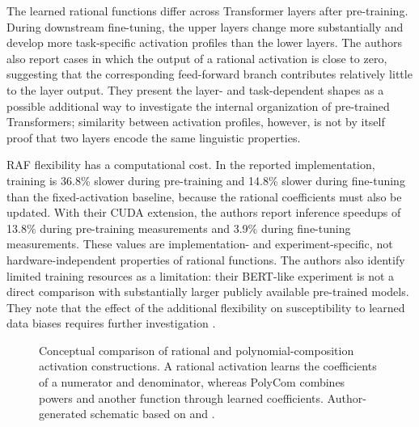 The learned rational functions differ across Transformer layers after
pre-training. During downstream fine-tuning, the upper layers change more
substantially and develop more task-specific activation profiles than
the lower layers. The authors also report cases in which the output of a
rational activation is close to zero, suggesting that the corresponding
feed-forward branch contributes relatively little to the layer output.
They present the layer- and task-dependent shapes as a possible
additional way to investigate the internal organization of
pre-trained Transformers; similarity between activation profiles,
however, is not by itself proof that two layers encode the same
linguistic properties.

RAF flexibility has a computational cost. In the reported implementation,
training is 36.8\% slower during pre-training and 14.8\% slower during
fine-tuning than the fixed-activation baseline, because the rational
coefficients must also be updated. With their CUDA extension, the
authors report inference speedups of 13.8\% during pre-training
measurements and 3.9\% during fine-tuning measurements. These values
are implementation- and experiment-specific, not hardware-independent
properties of rational functions. The authors also identify limited
training resources as a limitation: their BERT-like experiment is not
a direct comparison with substantially larger publicly available
pre-trained models. They note that the effect of the additional
flexibility on susceptibility to learned data biases requires further
investigation \parencite{fang2023raft}.

\begin{figure}[htbp]
    \centering
    
    \caption{Conceptual comparison of rational and polynomial-composition
    activation constructions. A rational activation learns the coefficients
    of a numerator and denominator, whereas PolyCom combines powers and
    another function through learned coefficients. Author-generated
    schematic based on \textcite{fang2023raft} and
    \textcite{zhuo2025polycom}.}
    \label{fig:act-learnable}
\end{figure}


